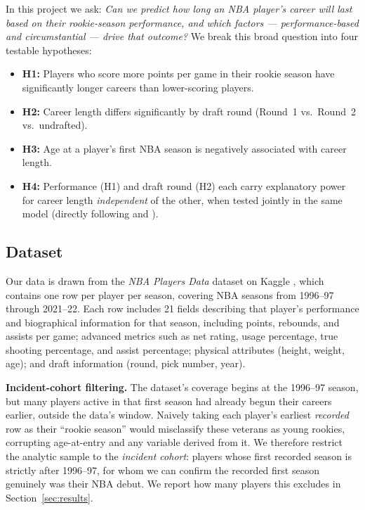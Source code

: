 \documentclass[10pt,twocolumn]{article}
\begin{document}
In this project we ask: \textit{Can we predict how long an NBA player's
career will last based on their rookie-season performance, and which
factors --- performance-based and circumstantial --- drive that outcome?}
We break this broad question into four testable hypotheses:

\begin{itemize}[leftmargin=1.4em]
  \item \textbf{H1:} Players who score more points per game in their
  rookie season have significantly longer careers than lower-scoring
  players.
  \item \textbf{H2:} Career length differs significantly by draft round
  (Round~1 vs.\ Round~2 vs.\ undrafted).
  \item \textbf{H3:} Age at a player's first NBA season is negatively
  associated with career length.
  \item \textbf{H4:} Performance (H1) and draft round (H2) each carry
  explanatory power for career length \textit{independent} of the
  other, when tested jointly in the same model (directly following
  \citet{staw1995sunk} and \citet{groothuis2004exit}).
\end{itemize}

\subsection{Dataset}
Our data is drawn from the \textit{NBA Players Data} dataset on Kaggle
\citep{kaggle2024nbadata}, which contains one row per player per season,
covering NBA seasons from 1996--97 through 2021--22. Each row includes 21
fields describing that player's performance and biographical information
for that season, including points, rebounds, and assists per game;
advanced metrics such as net rating, usage percentage, true shooting
percentage, and assist percentage; physical attributes (height, weight,
age); and draft information (round, pick number, year).

\textbf{Incident-cohort filtering.} The dataset's coverage begins at the
1996--97 season, but many players active in that first season had
already begun their careers earlier, outside the data's window. Naively
taking each player's earliest \emph{recorded} row as their ``rookie
season'' would misclassify these veterans as young rookies, corrupting
age-at-entry and any variable derived from it. We therefore restrict
the analytic sample to the \textit{incident cohort}: players whose
first recorded season is strictly after 1996--97, for whom we can
confirm the recorded first season genuinely was their NBA debut. We
report how many players this excludes in Section~\ref{sec:results}.
\end{document}
